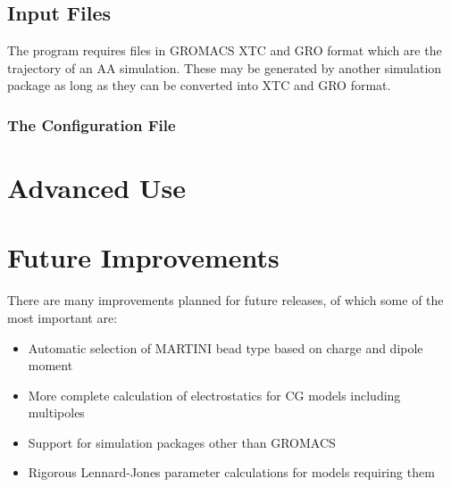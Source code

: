\documentclass[10pt]{article}
\begin{document}
\subsection{Input Files}
The program requires files in GROMACS XTC and GRO format which are the trajectory of an AA simulation.  These may be generated by another simulation package as long as they can be converted into XTC and GRO format.

\subsubsection{The Configuration File}


\section{Advanced Use}

\section{Future Improvements}
There are many improvements planned for future releases, of which some of the most important are:
\begin{itemize}
\item Automatic selection of MARTINI bead type based on charge and dipole moment
\item More complete calculation of electrostatics for CG models including multipoles
\item Support for simulation packages other than GROMACS
\item Rigorous Lennard-Jones parameter calculations for models requiring them
\end{itemize}
\end{document}
